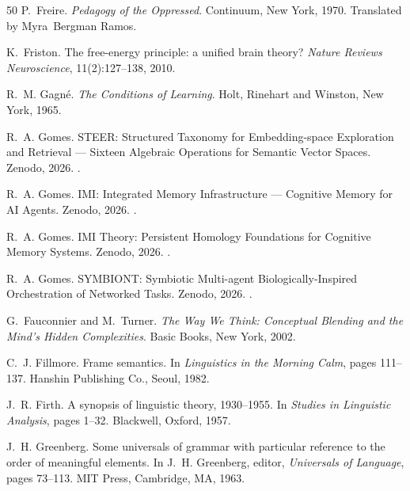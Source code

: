 \documentclass[12pt,a4paper]{article}
\begin{document}
\begin{thebibliography}{50}
P.~Freire.
\newblock \emph{Pedagogy of the Oppressed}.
\newblock Continuum, New York, 1970.
\newblock Translated by Myra~Bergman Ramos.

K.~Friston.
\newblock The free-energy principle: a unified brain theory?
\newblock \emph{Nature Reviews Neuroscience}, 11(2):127--138, 2010.

R.~M. Gagn\'e.
\newblock \emph{The Conditions of Learning}.
\newblock Holt, Rinehart and Winston, New York, 1965.

R.~A. Gomes.
\newblock STEER: Structured Taxonomy for Embedding-space Exploration and Retrieval --- Sixteen Algebraic Operations for Semantic Vector Spaces.
\newblock Zenodo, 2026.
\newblock {}.

R.~A. Gomes.
\newblock IMI: Integrated Memory Infrastructure --- Cognitive Memory for AI Agents.
\newblock Zenodo, 2026.
\newblock {}.

R.~A. Gomes.
\newblock IMI Theory: Persistent Homology Foundations for Cognitive Memory Systems.
\newblock Zenodo, 2026.
\newblock {}.

R.~A. Gomes.
\newblock SYMBIONT: Symbiotic Multi-agent Biologically-Inspired Orchestration of Networked Tasks.
\newblock Zenodo, 2026.
\newblock {}.

G.~Fauconnier and M.~Turner.
\newblock \emph{The Way We Think: Conceptual Blending and the Mind's Hidden Complexities}.
\newblock Basic Books, New York, 2002.

C.~J. Fillmore.
\newblock Frame semantics.
\newblock In \emph{Linguistics in the Morning Calm}, pages 111--137. Hanshin Publishing Co., Seoul, 1982.

J.~R. Firth.
\newblock A synopsis of linguistic theory, 1930--1955.
\newblock In \emph{Studies in Linguistic Analysis}, pages 1--32. Blackwell, Oxford, 1957.

J.~H. Greenberg.
\newblock Some universals of grammar with particular reference to the order of meaningful elements.
\newblock In J.~H. Greenberg, editor, \emph{Universals of Language}, pages 73--113. MIT Press, Cambridge, MA, 1963.


\end{thebibliography}
\end{document}
